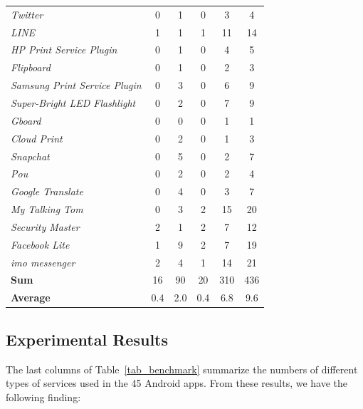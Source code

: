 \documentclass[sigconf,review, anonymous]{acmart}
\begin{document}
\begin{table}
\begin{tabular}{|l|ccccc|}
{\it Twitter}&0&1&0&3&4\\
{\it LINE}&1&1&1&11&14\\
{\it HP Print Service Plugin}&0&1&0&4&5\\
{\it Flipboard}&0&1&0&2&3\\
{\it Samsung Print Service Plugin}&0&3&0&6&9\\
{\it Super-Bright LED Flashlight}&0&2&0&7&9\\
{\it Gboard}&0&0&0&1&1\\
{\it Cloud Print}&0&2&0&1&3\\
{\it Snapchat}&0&5&0&2&7\\
{\it Pou}&0&2&0&2&4\\
{\it Google Translate}&0&4&0&3&7\\
{\it My Talking Tom}&0&3&2&15&20\\
{\it Security Master}&2&1&2&7&12\\
{\it Facebook Lite}&1&9&2&7&19 \\
{\it imo messenger}&2&4&1&14&21\\
\hline
{\bf Sum}&16&90&20&310&436\\
\hline
{\bf Average}&0.4&2.0&0.4&6.8&9.6\\
\hline
\end{tabular}
\label{tab_resultsum}
\end{table}

\subsection{Experimental Results}
The last columns of Table~\ref{tab_benchmark} summarize the numbers of different types of services used in the 45 Android apps. From these results, we have the following finding:

\medskip
{\setlength{\parindent}{0 em}
}\\
\medskip
\end{document}
